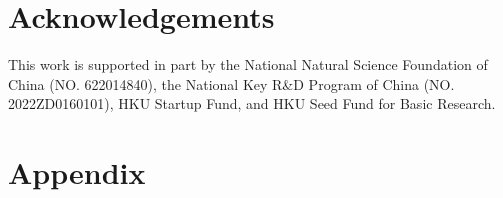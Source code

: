 \documentclass[10pt,twocolumn,letterpaper]{article}
\begin{document}










\vspace{-2mm}
\section*{Acknowledgements}
\vspace{-2mm}
This work is supported in part by the National Natural Science Foundation of China (NO. 622014840), the National Key R\&D Program of China (NO. 2022ZD0160101), HKU Startup Fund, and HKU Seed Fund for Basic Research.

\appendix
\section*{Appendix}


{
\small


}
\end{document}

